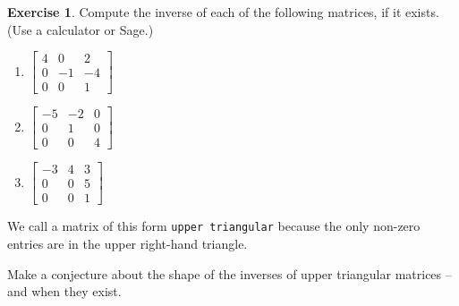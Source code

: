 \documentclass[handout]{beamer}
\newcommand{\fn}{\insertframenumber}
\theoremstyle{definition}
\newtheorem{exercise}{Exercise}
\renewcommand{\emph}[1]{{\color{blue}\texttt{#1}}}
\begin{document}
\begin{frame}{\fn}
	\begin{exercise}
		Compute the inverse of each of the following matrices, if it exists. (Use a calculator or Sage.)
		\begin{multicols}{3}
			\begin{enumerate}[label=(\alph*)]
			\item $\begin{bmatrix}
		4 & 0 & 2 \\
		0 & -1 & -4 \\
		0 & 0 & 1
		\end{bmatrix}$
			\item $\begin{bmatrix}
			-5 & -2 & 0 \\
			0 & 1 & 0 \\
			0 & 0 & 4
			\end{bmatrix}$
			\item $\begin{bmatrix}
			-3 & 4 & 3 \\
			0 & 0 & 5 \\
			0 & 0 & 1
			\end{bmatrix}$
		\end{enumerate}
		\end{multicols}
		We call a matrix of this form \emph{upper triangular} because the only non-zero entries are in the upper right-hand triangle.
		
		Make a conjecture about the shape of the inverses of upper triangular matrices -- and when they exist.
	\end{exercise}
\end{frame}
\end{document}
